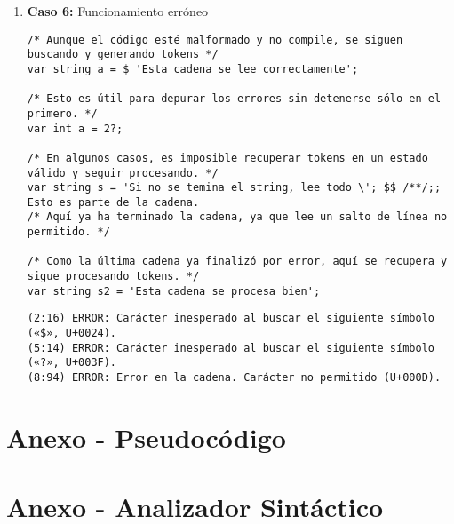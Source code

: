 \begin{enumerate}
    
    \item \textbf{Caso 6:} Funcionamiento erróneo
    \begin{tcolorbox}[title={Código fuente}, colback=white]
        \begin{lstlisting}
/* Aunque el código esté malformado y no compile, se siguen buscando y generando tokens */
var string a = $ 'Esta cadena se lee correctamente';

/* Esto es útil para depurar los errores sin detenerse sólo en el primero. */
var int a = 2?;

/* En algunos casos, es imposible recuperar tokens en un estado válido y seguir procesando. */
var string s = 'Si no se temina el string, lee todo \'; $$ /**/;; Esto es parte de la cadena.
/* Aquí ya ha terminado la cadena, ya que lee un salto de línea no permitido. */

/* Como la última cadena ya finalizó por error, aquí se recupera y sigue procesando tokens. */
var string s2 = 'Esta cadena se procesa bien';
        \end{lstlisting}      
    \end{tcolorbox}

    \begin{tcolorbox}[title={Errores detectados}, colback=white]
        \begin{lstlisting}
(2:16) ERROR: Carácter inesperado al buscar el siguiente símbolo («$», U+0024).
(5:14) ERROR: Carácter inesperado al buscar el siguiente símbolo («?», U+003F).
(8:94) ERROR: Error en la cadena. Carácter no permitido (U+000D).
        \end{lstlisting}
    \end{tcolorbox}

\end{enumerate}

\newpage

\section{Anexo - Pseudocódigo}


\newpage

\section{Anexo - Analizador Sintáctico}

